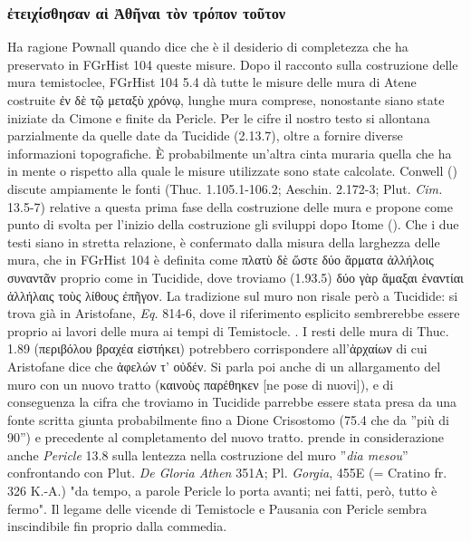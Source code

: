 {            \subsubsection{\textgreek{ἐτειχίσθησαν αἱ Ἀθῆναι τὸν τρόπον τοῦτον}}
            Ha ragione Pownall quando dice che è il desiderio di completezza che ha preservato in FGrHist 104  queste misure. Dopo il racconto sulla costruzione delle mura temistoclee, FGrHist 104 5.4 dà tutte le misure delle mura di Atene costruite \textgreek{ἐν δὲ τῷ μεταξὺ χρόνῳ}, lunghe mura comprese, nonostante siano state iniziate da  Cimone e finite da Pericle. Per le cifre il nostro testo si allontana parzialmente da quelle date da Tucidide (2.13.7), oltre a fornire diverse informazioni topografiche. È probabilmente un'altra cinta muraria quella che ha in mente o rispetto alla quale le misure utilizzate sono state calcolate. Conwell (\cite*[37-54]{Conwell2008}) discute ampiamente le fonti (Thuc. 1.105.1-106.2; Aeschin. 2.172-3; Plut. \emph{Cim.} 13.5-7) relative a questa prima fase della costruzione delle mura e propone come punto di svolta per l'inizio della costruzione gli sviluppi dopo Itome (\cite*[52]{Conwell2008}). Che i due testi siano in stretta relazione, è confermato dalla misura della larghezza delle mura, che in FGrHist 104 è definita come \textgreek{πλατὺ δὲ ὥστε δύο ἅρματα ἀλλήλοις συναντᾶν} proprio come in Tucidide, dove troviamo (1.93.5) \textgreek{δύο γὰρ ἅμαξαι ἐναντίαι ἀλλήλαις τοὺς λίθους ἐπῆγον}. La tradizione sul muro non risale però a Tucidide: si trova già in Aristofane, \emph{Eq.} 814-6, dove il riferimento esplicito sembrerebbe essere proprio ai lavori delle mura ai tempi di Temistocle. \cite[272-3]{Montana2002}. I resti delle mura di Thuc. 1.89 (\textgreek{περιβόλου βραχέα εἱστήκει}) potrebbero corrispondere all'\textgreek{ἀρχαίων} di cui Aristofane  dice che \textgreek{ἀφελών τ’ οὐδέν}. Si parla poi anche di un allargamento del muro con un nuovo tratto (\textgreek{καινοὺς παρέθηκεν} [ne pose di nuovi]), e di conseguenza la cifra che troviamo in Tucidide parrebbe essere stata presa da una fonte scritta giunta probabilmente fino a Dione Crisostomo (75.4 che da ''più di 90'') e precedente al completamento del nuovo tratto. \cite[203]{Totaro2004} prende in considerazione anche \emph{Pericle}  13.8 sulla lentezza nella costruzione del muro ''\emph{dia mesou}''  confrontando con Plut. \emph{De Gloria Athen} 351A; Pl. \emph{Gorgia}, 455E (= Cratino fr. 326 K.-A.) "da tempo, a parole Pericle  lo porta avanti; nei fatti, però, tutto è fermo". Il legame delle vicende di Temistocle e Pausania  con Pericle  sembra inscindibile fin proprio dalla commedia. 
}
